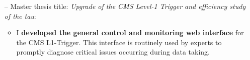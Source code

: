 \documentclass[10pt,a4paper]{altacv}
\begin{document}
\begin{itemize}
    \setlength{\itemindent}{0.5em}
    \item[--]   \small{Master thesis title: \textit{Upgrade of the CMS Level-1 Trigger and efficiency study of the tau}}:
    \begin{itemize}
    \item  \small{I \textbf{developed the general control and monitoring web interface} for the CMS L1-Trigger. This interface is routinely used by experts to promptly diagnose critical issues occurring during data taking.}
    \end{itemize}
\end{itemize}
















\end{document}
